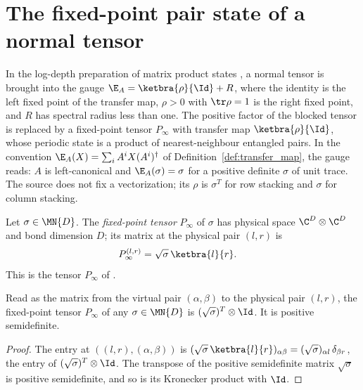 \section{The fixed-point pair state of a normal tensor}
\label{sec:mps_rfp_fixed_point_pairs}

In the log-depth preparation of matrix product states
\cite{Malz2024Preparation}, a normal tensor is brought into the gauge
$\E_A=\ketbra{\rho}{\Id}+R$, where the identity is the left fixed point of
the transfer map, $\rho>0$ with $\tr\rho=1$ is the right fixed point, and
$R$ has spectral radius less than one. The positive factor of the blocked
tensor is replaced by a fixed-point tensor $P_\infty$ with transfer map
$\ketbra{\rho}{\Id}$, whose periodic state is a product of nearest-neighbour
entangled pairs. In the convention $\E_A(X)=\sum_iA^iX(A^i)^\dagger$ of
Definition~\ref{def:transfer_map}, the gauge reads: $A$ is left-canonical
and $\E_A(\sigma)=\sigma$ for a positive definite $\sigma$ of unit trace.
The source does not fix a vectorization; its $\rho$ is $\sigma^T$ for row
stacking and $\sigma$ for column stacking.

\begin{definition}
    \label{def:prep_fixed_point_tensor}
    \leanok
    Let $\sigma\in\MN{D}$. The \emph{fixed-point tensor} $P_\infty$ of
    $\sigma$ has physical space $\C^D\otimes\C^D$ and bond dimension $D$;
    its matrix at the physical pair $(l,r)$ is
    \begin{align}
        P_\infty^{(l,r)}
         & =\sqrt{\sigma}\,\ketbra{l}{r}.
        \notag
    \end{align}
    This is the tensor $P_\infty$ of \cite{Malz2024Preparation}.
\end{definition}

\begin{theorem}
    \label{thm:prep_fixed_point_tensor_psd}
    \leanok
    Read as the matrix from the virtual pair $(\alpha,\beta)$ to the
    physical pair $(l,r)$, the fixed-point tensor $P_\infty$ of any
    $\sigma\in\MN{D}$ is $(\sqrt{\sigma})^T\otimes\Id$. It is positive
    semidefinite.
\end{theorem}
\begin{proof}
    \leanok
    The entry at $((l,r),(\alpha,\beta))$ is
    $(\sqrt\sigma\,\ketbra{l}{r})_{\alpha\beta}=(\sqrt\sigma)_{\alpha l}\,\delta_{\beta r}$,
    the entry of $(\sqrt\sigma)^T\otimes\Id$. The transpose of the
    positive semidefinite matrix $\sqrt\sigma$ is positive semidefinite,
    and so is its Kronecker product with $\Id$.
\end{proof}

